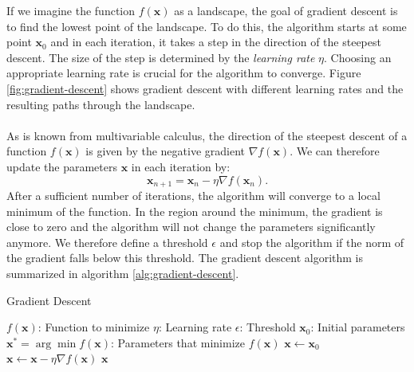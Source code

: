 If we imagine the function $f(\bm{x})$ as a landscape, the goal of gradient descent is to find the lowest point of the landscape.
To do this, the algorithm starts at some point $\bm{x}_0$ and in each iteration, it takes a step in the direction of the steepest descent. 
The size of the step is determined by the \textit{learning rate} $\eta$.
Choosing an appropriate learning rate is crucial for the algorithm to converge.
Figure \ref{fig:gradient-descent} shows gradient descent with different learning rates and the resulting paths through the landscape.
\\
\\
As is known from multivariable calculus, the direction of the steepest descent of a function $f(\bm{x})$ is given by the negative gradient $\nabla f(\bm{x})$.
We can therefore update the parameters $\bm{x}$ in each iteration by:
\begin{equation}
    \bm{x}_{n+1} = \bm{x}_n - \eta \nabla f(\bm{x}_n) \text{.}
    \label{eq:gradient-descent}
\end{equation}
After a sufficient number of iterations, the algorithm will converge to a local minimum of the function. 
In the region around the minimum, the gradient is close to zero and the algorithm will not change the parameters significantly anymore.
We therefore define a threshold $\epsilon$ and stop the algorithm if the norm of the gradient falls below this threshold. 
The gradient descent algorithm is summarized in algorithm \ref{alg:gradient-descent}.
\begin{algorithm}
    \caption{Gradient Descent}
    \label{alg:gradient-descent}
    \begin{algorithmic}[1]
        \renewcommand{\algorithmicensure}{\textbf{Output:}}
        \Require
            \Statex $f(\bm{x})$: Function to minimize
            \Statex $\eta$: Learning rate
            \Statex $\epsilon$: Threshold
            \Statex $\bm{x}_0$: Initial parameters
        \Ensure $\bm{x^*}=\arg\min f(\bm{x})$: Parameters that minimize $f(\bm{x})$
        \Statex
        \State $\bm{x} \gets \bm{x}_0$ 
         
            \State $\bm{x} \gets \bm{x} - \eta \nabla f(\bm{x})$ 
        \EndWhile
        \State \Return $\bm{x}$ 
    \end{algorithmic}
\end{algorithm}

